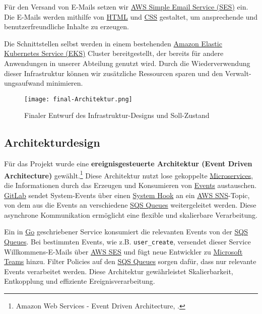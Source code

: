 Für den Versand von E-Mails setzen wir \hyperlink{SES}{\textcolor{AOBlau}{AWS Simple Email Service (SES)}} ein. Die E-Mails werden mithilfe von \hyperlink{HTML}{\textcolor{AOBlau}{HTML}} und \hyperlink{CSS}{\textcolor{AOBlau}{CSS}} gestaltet, um ansprechende und benutzerfreundliche Inhalte zu erzeugen.

Die Schnittstellen selbst werden in einem bestehenden \hyperlink{EKS}{\textcolor{AOBlau}{Amazon Elastic Kubernetes Service (EKS)}} Cluster bereitgestellt, der bereits für andere Anwendungen in unserer Abteilung genutzt wird. Durch die Wiederverwendung dieser Infrastruktur können wir zusätzliche Ressourcen sparen und den Verwalt-
ungsaufwand minimieren.

\begin{figure}[h]
	\centering
	\texttt{[image: final-Architektur.png]}
	\caption{Finaler Entwurf des Infrastruktur-Designs und Soll-Zustand}
\end{figure}

\clearpage
\subsection{Architekturdesign}
\label{sec:Architekturdesign}

Für das Projekt wurde eine \textbf{ereignisgesteuerte Architektur (Event Driven Architecture)} gewählt.\footnote{Amazon Web Services - Event Driven Architecture, \cite{awsEDA}.} Diese Architektur nutzt lose gekoppelte \hyperlink{Microservices}{\textcolor{AOBlau}{Microservices}}, die Informationen durch das Erzeugen und Konsumieren von \hyperlink{GitLabEvent}{\textcolor{AOBlau}{Events}} austauschen. \hyperlink{GitLab}{\textcolor{AOBlau}{GitLab}} sendet System-Events über einen \hyperlink{GitLabSystemhooks}{\textcolor{AOBlau}{System Hook}} an ein \hyperlink{SNS}{\textcolor{AOBlau}{AWS SNS}}-Topic, von dem aus die Events an verschiedene \hyperlink{SQS}{\textcolor{AOBlau}{SQS Queues}} weitergeleitet werden. Diese asynchrone Kommunikation ermöglicht eine flexible und skalierbare Verarbeitung.

Ein in \hyperlink{Go}{\textcolor{AOBlau}{Go}} geschriebener Service konsumiert die relevanten Events von der \hyperlink{SQS}{\textcolor{AOBlau}{SQS Queues}}. Bei bestimmten Events, wie z.B. \texttt{user\_create}, versendet dieser Service Willkommens-E-Mails über \hyperlink{SES}{\textcolor{AOBlau}{AWS SES}} und fügt neue Entwickler zu \hyperlink{MicrosoftTeams}{\textcolor{AOBlau}{Microsoft Teams}} hinzu. Filter Policies auf den \hyperlink{SQS}{\textcolor{AOBlau}{SQS Queues}} sorgen dafür, dass nur relevante Events verarbeitet werden. Diese Architektur gewährleistet Skalierbarkeit, Entkopplung und effiziente Ereignisverarbeitung.

